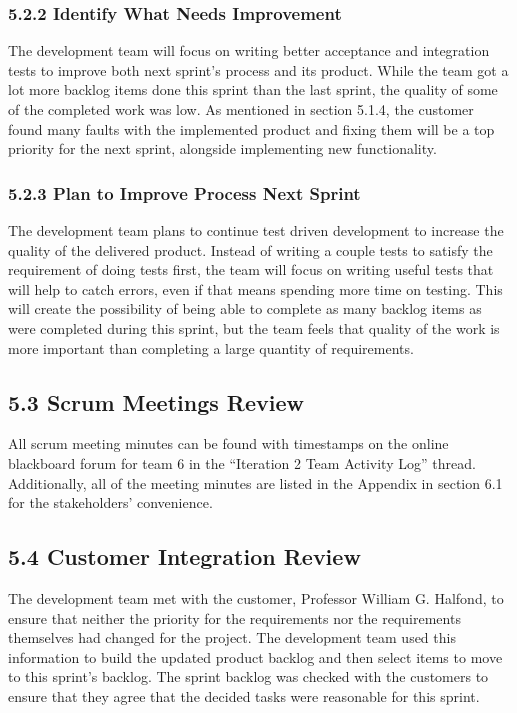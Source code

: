 \documentclass[]{article}
\begin{document}
\subsubsection{5.2.2 Identify What Needs
Improvement}\label{identify-what-needs-improvement}

The development team will focus on writing better acceptance and
integration tests to improve both next sprint's process and its product.
While the team got a lot more backlog items done this sprint than the
last sprint, the quality of some of the completed work was low. As
mentioned in section 5.1.4, the customer found many faults with the
implemented product and fixing them will be a top priority for the next
sprint, alongside implementing new functionality.

\subsubsection{5.2.3 Plan to Improve Process Next
Sprint}\label{plan-to-improve-process-next-sprint}

The development team plans to continue test driven development to
increase the quality of the delivered product. Instead of writing a
couple tests to satisfy the requirement of doing tests first, the team
will focus on writing useful tests that will help to catch errors, even
if that means spending more time on testing. This will create the
possibility of being able to complete as many backlog items as were
completed during this sprint, but the team feels that quality of the
work is more important than completing a large quantity of requirements.

\subsection{5.3 Scrum Meetings Review}\label{scrum-meetings-review}

All scrum meeting minutes can be found with timestamps on the online
blackboard forum for team 6 in the ``Iteration 2 Team Activity Log''
thread. Additionally, all of the meeting minutes are listed in the
Appendix in section 6.1 for the stakeholders' convenience.

\subsection{5.4 Customer Integration
Review}\label{customer-integration-review}

The development team met with the customer, Professor William G.
Halfond, to ensure that neither the priority for the requirements nor
the requirements themselves had changed for the project. The development
team used this information to build the updated product backlog and then
select items to move to this sprint's backlog. The sprint backlog was
checked with the customers to ensure that they agree that the decided
tasks were reasonable for this sprint.
\end{document}
